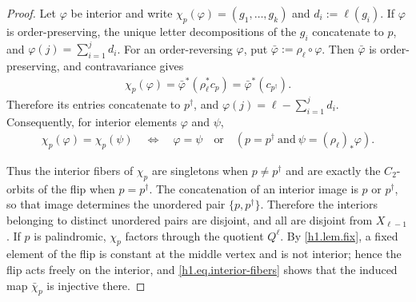 \documentclass[a4paper,dvipdfmx,11pt]{amsart}
\begin{document}
\begin{proof}
  Let $\varphi$ be interior and write
  $\chi_p(\varphi)=(g_1,\ldots,g_k)$ and $d_i:=\ell(g_i)$.
  If $\varphi$ is order-preserving, the unique letter decompositions of the $g_i$ concatenate to $p$, and $\varphi(j)=\sum_{i=1}^{j}d_i$.
  For an order-reversing $\varphi$, put $\bar\varphi:=\rho_{\ell}\circ\varphi$.
  Then $\bar\varphi$ is order-preserving, and contravariance gives
  \begin{align}
    \chi_p(\varphi)
    =
    \bar\varphi^{*}(\rho_{\ell}^{*}c_p)
    =
    \bar\varphi^{*}(c_{p^{\dag}}).
  \end{align}
  Therefore its entries concatenate to $p^{\dag}$, and $ \varphi(j)=\ell-\sum_{i=1}^{j}d_i$.
  Consequently, for interior elements $\varphi$ and $\psi$,
  \begin{align}\label{h1.eq.interior-fibers}
    \chi_p(\varphi)=\chi_p(\psi)
    \quad\Longleftrightarrow\quad
    \varphi=\psi
    \quad\text{or}\quad
    (p=p^{\dag}\ \text{and}\ \psi=(\rho_{\ell})_{*}\varphi).
  \end{align}

  Thus the interior fibers of $\chi_p$ are singletons when $p\neq p^{\dag}$ and are exactly the $C_2$-orbits of the flip when $p=p^{\dag}$.
  The concatenation of an interior image is $p$ or $p^{\dag}$, so that image determines the unordered pair $\{p,p^{\dag}\}$.
  Therefore the interiors belonging to distinct unordered pairs are disjoint, and all are disjoint from $X_{\ell-1}$.
  If $p$ is palindromic, $\chi_p$ factors through the quotient $Q^{\ell}$.
  By \cref{h1.lem.fix}, a fixed element of the flip is constant at the middle vertex and is not interior;
  hence the flip acts freely on the interior, and \eqref{h1.eq.interior-fibers} shows that the induced map $\bar\chi_p$ is injective there.


\end{proof}
\end{document}
